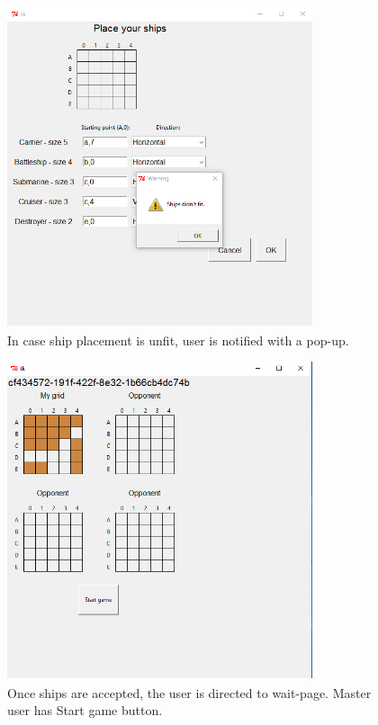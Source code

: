 \documentclass[]{article}
\begin{document}
\begin{figure}[!hbt]
	\centering
	\includegraphics[width=0.8\textwidth]{ShipUnfit.png}
	\caption{In case ship placement is unfit, user is notified with a pop-up.}
	\label{fig:ShipUnfit}
\end{figure}

\begin{figure}[!hbt]
	\centering
	\includegraphics[width=0.8\textwidth]{WaitPage.png}
	\caption{Once ships are accepted, the user is directed to wait-page. Master user has Start game button.}
	\label{fig:Waitpage}
\end{figure}
\end{document}
